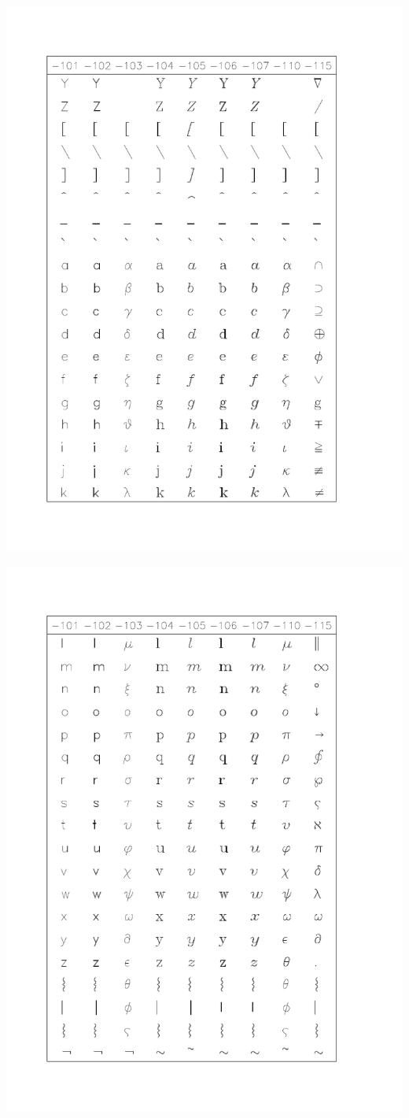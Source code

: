 \documentclass[11pt,nolof]{starlink}
\begin{document}
\includegraphics[height=0.95\textheight]{sun83_c4}

\includegraphics[height=0.95\textheight]{sun83_c5}
\end{document}
